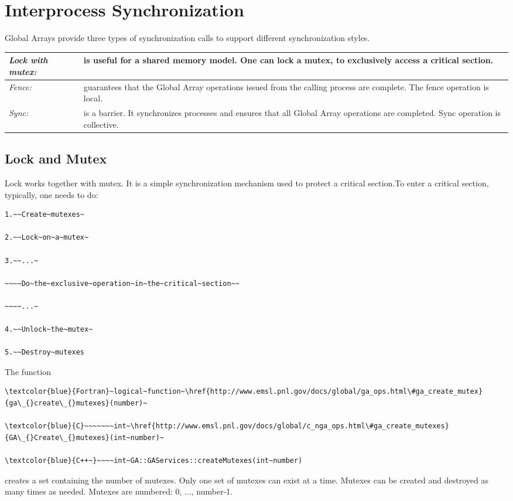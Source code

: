 \chapter{Interprocess Synchronization}

Global Arrays provide three types of synchronization calls to support
different synchronization styles. 

\begin{tabular}{|>{\centering}p{3cm}|>{\raggedright}p{6cm}|}
\hline 
\emph{Lock with mutex:}  & is useful for a shared memory model. One can lock a mutex, to exclusively
access a critical section. \tabularnewline
\hline 
\emph{Fence:}  & guarantees that the Global Array operations issued from the calling
process are complete. The fence operation is local. \tabularnewline
\hline 
\emph{Sync:}  & is a barrier. It synchronizes processes and ensures that all Global
Array operations are completed. Sync operation is collective. \tabularnewline
\hline
\end{tabular}


\section{Lock and Mutex }

Lock works together with mutex. It is a simple synchronization mechanism
used to protect a critical section.To enter a critical section, typically,
one needs to do:
\begin{verbatim}
1.~~Create~mutexes~

2.~~Lock~on~a~mutex~

3.~~...~

~~~~Do~the~exclusive~operation~in~the~critical~section~~

~~~~...~

4.~~Unlock~the~mutex~

5.~~Destroy~mutexes
\end{verbatim}
The function
\begin{verbatim}
\textcolor{blue}{Fortran}~logical~function~\href{http://www.emsl.pnl.gov/docs/global/ga_ops.html\#ga_create_mutex}{ga\_{}create\_{}mutexes}(number)~

\textcolor{blue}{C}~~~~~~~int~\href{http://www.emsl.pnl.gov/docs/global/c_nga_ops.html\#ga_create_mutexes}{GA\_{}Create\_{}mutexes}(int~number)~

\textcolor{blue}{C++~}~~~~int~GA::GAServices::createMutexes(int~number)
\end{verbatim}
creates a set containing the number of mutexes. Only one set of mutexes
can exist at a time. Mutexes can be created and destroyed as many
times as needed. Mutexes are numbered: 0, ..., number-1.

